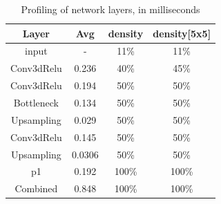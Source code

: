\begin{table}[ht]
    \centering
    \begin{tabular}{|c|c|c|c|}
        \hline
        Layer  & Avg & density & density[5x5]\\
        \hline
        input & - & 11\% & 11\% \\ 
         Conv3dRelu   & 0.236 & 40\% & 45\% \\
        Conv3dRelu & 0.194  & 50\% & 50\% \\
        Bottleneck &0.134  & 50\% & 50\% \\
        Upsampling & 0.029 & 50\% & 50\% \\
        Conv3dRelu & 0.145 & 50\% & 50\%  \\
        Upsampling  & 0.0306  & 50\% & 50\% \\
        p1  & 0.192  &  100\% & 100\% \\
        Combined    & 0.848 & 100\% & 100\% \\
        \hline
    \end{tabular}
    \caption{Profiling of network layers, in milliseconds}
    \label{tab:kernel_performance}
\end{table}